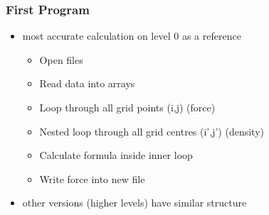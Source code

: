 \documentclass{beamer}
\begin{document}
\begin{frame}
  \frametitle{First Program}
  \begin{itemize}
   \item most accurate calculation on level 0 as a reference
   \begin{itemize}
    \item Open files
    \item Read data into arrays
    \item Loop through all grid points (i,j) (force)
    \item Nested loop through all grid centres (i',j') (density)
    \item Calculate formula inside inner loop
    \item Write force into new file
   \end{itemize}
   \item other versions (higher levels) have similar structure
  \end{itemize}
\end{frame} 
\end{document}

